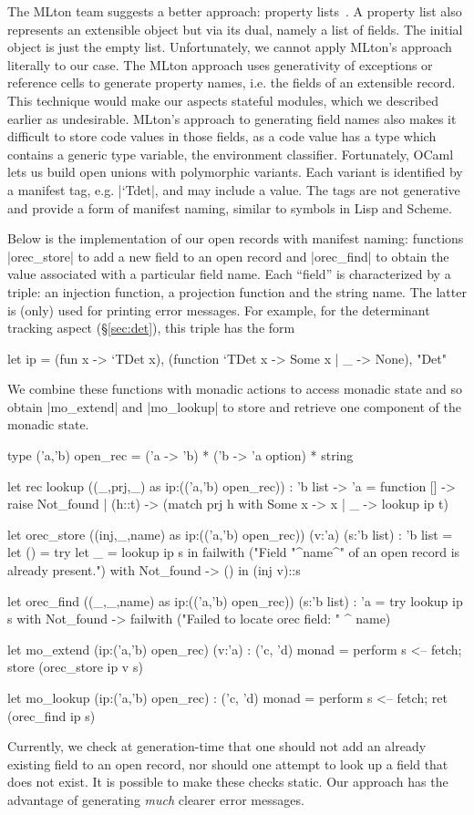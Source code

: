 \documentclass{elsart}
\begin{document}
The MLton team suggests a better approach: property 
lists~\cite{mlton-proplist}.  A property list also represents an
extensible object but via its dual, namely a list of fields.  The
initial object is just the empty list.  Unfortunately, we cannot apply
MLton's approach literally to our case. The MLton
approach uses generativity of exceptions or reference cells to
generate property names, i.e. the fields of an extensible record. This
technique would make our aspects stateful modules, which we described
earlier as undesirable. MLton's approach to generating field names also makes
it difficult to store code values in those fields, as a code value has a type
which contains a generic type variable, the environment classifier. 
Fortunately, OCaml lets us build open unions with
polymorphic variants. Each variant is identified by a manifest tag,
e.g. |`Tdet|, and may include a value. The tags are not generative and
provide a form of manifest naming, similar to symbols in Lisp and Scheme.

Below is the implementation of our open records with manifest
naming: functions |orec_store| to add a new field to an open record
and |orec_find| to obtain the value associated with a particular field
name. Each ``field'' is characterized by a triple: an injection function, 
a projection function and the string name. The latter is (only) used for 
printing error messages. For example, for the
determinant tracking aspect (\S\ref{sec:det}), this triple has the form
\begin{code}
let ip = 
  (fun x -> `TDet x), (function `TDet x -> Some x | _ -> None), "Det"
\end{code}
We combine these functions with monadic
actions to access monadic state and so obtain 
|mo_extend| and |mo_lookup| to store and retrieve one component 
of the monadic state.
\begin{code}
type ('a,'b) open_rec = ('a -> 'b) * ('b -> 'a option)  * string

let rec lookup ((_,prj,_) as ip:(('a,'b) open_rec)) : 'b list -> 'a = 
   function [] -> raise Not_found
   | (h::t) -> (match prj h with Some x -> x | _ -> lookup ip t)

let orec_store ((inj,_,name) as ip:(('a,'b) open_rec)) (v:'a) (s:'b list) 
   : 'b list =
  let () = 
    try let _ = lookup ip s in 
        failwith ("Field "^name^" of an open record is already present.")
    with Not_found -> () in
  (inj v)::s

let orec_find ((_,_,name) as ip:(('a,'b) open_rec)) (s:'b list) : 'a =
  try lookup ip s 
  with Not_found -> failwith ("Failed to locate orec field: " ^ name)

let mo_extend (ip:('a,'b) open_rec) (v:'a) : ('c, 'd) monad = 
  perform s <-- fetch; store (orec_store ip v s)

let mo_lookup (ip:('a,'b) open_rec) : ('c, 'd) monad =
  perform s <-- fetch; ret (orec_find ip s)
\end{code}
%
Currently, we check at generation-time that one should not add an
already existing field to an open record, nor should one attempt to
look up a field that does not exist. It is possible to make these
checks static.  Our approach has the advantage of generating \emph{much}
clearer error messages.
\end{document}
